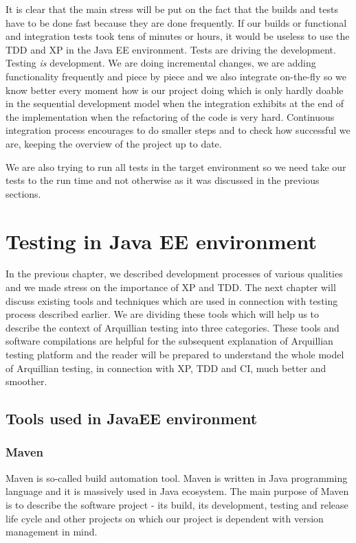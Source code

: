 \documentclass[12pt,final,oneside]{fithesis}
\begin{document}
It is clear that the main stress will be put on the fact that the builds and tests have to be done fast because they are done frequently. If our builds or functional and integration tests took tens of minutes or hours, it would be useless to use the TDD and XP in the Java EE environment. Tests are driving the development. Testing \emph{is} development. We are doing incremental changes, we are adding functionality frequently and piece by piece and we also integrate on-the-fly so we know better every moment how is our project doing which is only hardly doable in the sequential development model when the integration exhibits at the end of the implementation when the refactoring of the code is very hard. Continuous integration process encourages to do smaller steps and to check how successful we are, keeping the overview of the project up to date.

We are also trying to run all tests in the target environment so we need take our tests to the run time and not otherwise as it was discussed in the previous sections.

\chapter{Testing in Java EE environment}

In the previous chapter, we described development processes of various qualities and we made stress on the importance of XP and TDD. The next chapter will discuss existing tools and techniques which are used in connection with testing process described earlier. We are dividing these tools which will help us to describe the context of Arquillian testing into three categories. These tools and software compilations are helpful for the subsequent explanation of Arquillian testing platform and the reader will be prepared to understand the whole model of Arquillian testing, in connection with XP, TDD and CI, much better and smoother.

	\section{Tools used in JavaEE environment}
	
		\subsection{Maven}

Maven is so-called build automation tool. Maven is written in Java programming language and it is massively used in Java ecosystem. The main purpose of Maven is to describe the software project - its build, its development, testing and release life cycle and other projects on which our project is dependent with version management in mind.
\end{document}
